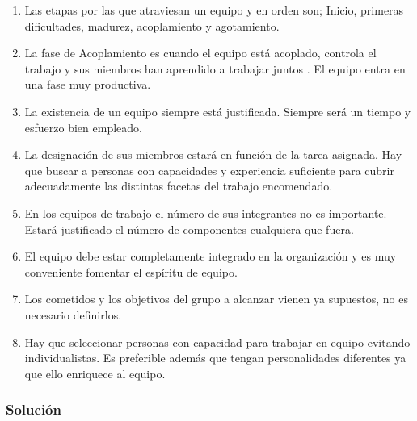 \begin{enumerate}[label=\alph*.]
    \item Las etapas por las que atraviesan un equipo y en orden son; Inicio, primeras dificultades, madurez, acoplamiento y agotamiento.
    \item La fase de Acoplamiento es cuando el equipo está acoplado, controla el trabajo y sus miembros han aprendido a trabajar juntos . El equipo entra en una fase muy productiva.
    \item La existencia de un equipo siempre está justificada. Siempre será un tiempo y esfuerzo bien empleado.
    \item La designación de sus miembros estará en función de la tarea asignada. Hay que buscar a personas con capacidades y experiencia suficiente para cubrir adecuadamente las distintas facetas del trabajo encomendado.
    \item En los equipos de trabajo el número de sus integrantes no es importante. Estará justificado el número de componentes cualquiera que fuera.
    \item El equipo debe estar completamente integrado en la organización y es muy conveniente fomentar el espíritu de equipo.
    \item Los cometidos y los objetivos del grupo a alcanzar vienen ya supuestos, no es necesario definirlos.
    \item Hay que seleccionar personas con capacidad para trabajar en equipo evitando individualistas. Es preferible además que tengan personalidades diferentes ya que ello enriquece al equipo.
\end{enumerate}

\subsubsection{Solución}

